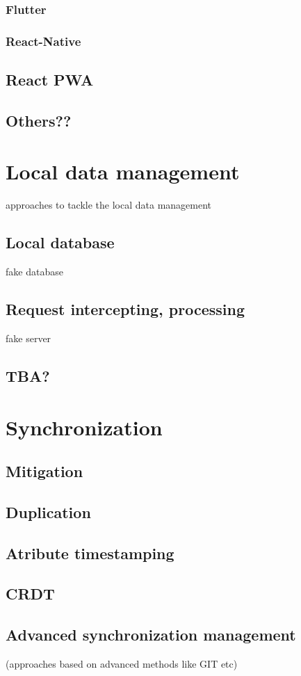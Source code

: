 \documentclass[
  digital,     %
  color,       %
  oneside,     %
  nosansbold,  %
  nocolorbold, %
  lof,         %
  lot,         %
]{fithesis4}
\begin{document}
\subsubsection{Flutter}
\subsubsection{React-Native}
\subsection{React PWA}
\subsection{Others??}
\section{Local data management}
approaches to tackle the local data management
\subsection{Local database}
fake database
\subsection{Request intercepting, processing}
fake server
\subsection{TBA?}
\section{Synchronization}
\subsection{Mitigation}
\subsection{Duplication}
\subsection{Atribute timestamping}
\subsection{CRDT}
\subsection{Advanced synchronization management}
(approaches based on advanced methods like GIT etc)
\end{document}
